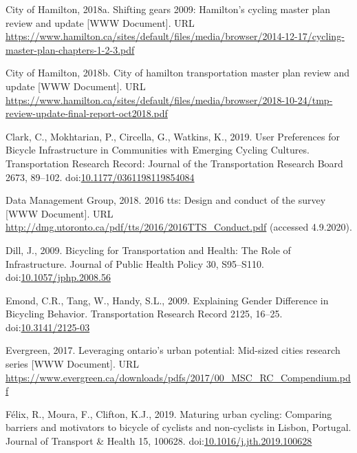 \documentclass[]{elsarticle} %
\begin{document}
\leavevmode\hypertarget{ref-Cmp2009}{}%
City of Hamilton, 2018a. Shifting gears 2009: Hamilton's cycling master
plan review and update {[}WWW Document{]}. URL
\url{https://www.hamilton.ca/sites/default/files/media/browser/2014-12-17/cycling-master-plan-chapters-1-2-3.pdf}

\leavevmode\hypertarget{ref-Tmp2018}{}%
City of Hamilton, 2018b. City of hamilton transportation master plan
review and update {[}WWW Document{]}. URL
\url{https://www.hamilton.ca/sites/default/files/media/browser/2018-10-24/tmp-review-update-final-report-oct2018.pdf}

\leavevmode\hypertarget{ref-clarkUserPreferencesBicycle2019a}{}%
Clark, C., Mokhtarian, P., Circella, G., Watkins, K., 2019. User
Preferences for Bicycle Infrastructure in Communities with Emerging
Cycling Cultures. Transportation Research Record: Journal of the
Transportation Research Board 2673, 89--102.
doi:\href{https://doi.org/10.1177/0361198119854084}{10.1177/0361198119854084}

\leavevmode\hypertarget{ref-Dmg2018tts}{}%
Data Management Group, 2018. 2016 tts: Design and conduct of the survey
{[}WWW Document{]}. URL
\url{http://dmg.utoronto.ca/pdf/tts/2016/2016TTS_Conduct.pdf} (accessed
4.9.2020).

\leavevmode\hypertarget{ref-dillBicyclingTransportationHealth2009}{}%
Dill, J., 2009. Bicycling for Transportation and Health: The Role of
Infrastructure. Journal of Public Health Policy 30, S95--S110.
doi:\href{https://doi.org/10.1057/jphp.2008.56}{10.1057/jphp.2008.56}

\leavevmode\hypertarget{ref-emondExplainingGenderDifference2009}{}%
Emond, C.R., Tang, W., Handy, S.L., 2009. Explaining Gender Difference
in Bicycling Behavior. Transportation Research Record 2125, 16--25.
doi:\href{https://doi.org/10.3141/2125-03}{10.3141/2125-03}

\leavevmode\hypertarget{ref-evergreenleveraging2017}{}%
Evergreen, 2017. Leveraging ontario's urban potential: Mid-sized cities
research series {[}WWW Document{]}. URL
\url{https://www.evergreen.ca/downloads/pdfs/2017/00_MSC_RC_Compendium.pdf}

\leavevmode\hypertarget{ref-felixMaturingUrbanCycling2019}{}%
Félix, R., Moura, F., Clifton, K.J., 2019. Maturing urban cycling:
Comparing barriers and motivators to bicycle of cyclists and
non-cyclists in Lisbon, Portugal. Journal of Transport \& Health 15,
100628.
doi:\href{https://doi.org/10.1016/j.jth.2019.100628}{10.1016/j.jth.2019.100628}
\end{document}
